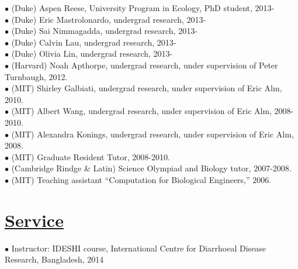 \documentclass[overlapped,line,11pt]{res}
\begin{document}
\begin{resume}
$\bullet$\hspace{.1in} (Duke) Aspen Reese, University Program in
Ecology, PhD student, 2013- \\
$\bullet$\hspace{.1in} (Duke) Eric Mastrolonardo, undergrad research, 2013- \\
$\bullet$\hspace{.1in} (Duke) Sai Nimmagadda, undergrad research, 2013- \\
$\bullet$\hspace{.1in} (Duke) Calvin Lau, undergrad research, 2013- \\
$\bullet$\hspace{.1in} (Duke) Olivia Lin, undergrad research, 2013- \\
$\bullet$\hspace{.1in} (Harvard) Noah Apthorpe, undergrad research, under
supervision of Peter Turnbaugh, 2012. \\
$\bullet$\hspace{.1in} (MIT) Shirley Galbiati, undergrad research, under
supervision of Eric Alm, 2010. \\
$\bullet$\hspace{.1in} (MIT) Albert Wang, undergrad research, under
supervision of Eric Alm, 2008-2010. \\
$\bullet$\hspace{.1in} (MIT) Alexandra Konings, undergrad research, under
supervision of Eric Alm, 2008. \\
$\bullet$\hspace{.1in} (MIT) Graduate Resident Tutor, 2008-2010. \\
$\bullet$\hspace{.1in} (Cambridge Rindge \& Latin) Science Olympiad and Biology tutor, 2007-2008. \\
$\bullet$\hspace{.1in} (MIT) Teaching assistant ``Computation for Biological Engineers,'' 2006. 

\section{\underline{\sc Service}}
\vspace{.05in}

\hangindent=0.5in $\bullet$\hspace{.1in} Instructor: IDESHI course,
International Centre for Diarrhoeal Disease Research, Bangladesh, 2014 \\


\end{resume}
\end{document}
